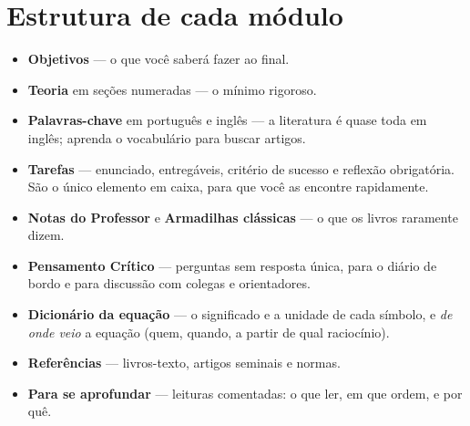 \documentclass[10pt,a4paper,twocolumn,openany]{report}
\begin{document}
\section*{Estrutura de cada módulo}
\begin{itemize}
  \item \textbf{Objetivos} --- o que você saberá fazer ao final.
  \item \textbf{Teoria} em seções numeradas --- o mínimo rigoroso.
  \item \textbf{Palavras-chave} em português e inglês --- a literatura é quase
        toda em inglês; aprenda o vocabulário para buscar artigos.
  \item \textbf{Tarefas} --- enunciado, entregáveis, critério de sucesso e
        reflexão obrigatória. São o único elemento em caixa, para que você as
        encontre rapidamente.
  \item \textbf{Notas do Professor} e \textbf{Armadilhas clássicas} --- o que
        os livros raramente dizem.
  \item \textbf{Pensamento Crítico} --- perguntas sem resposta única, para o
        diário de bordo e para discussão com colegas e orientadores.
  \item \textbf{Dicionário da equação} --- o significado e a unidade de cada
        símbolo, e \emph{de onde veio} a equação (quem, quando, a partir de
        qual raciocínio).
  \item \textbf{Referências} --- livros-texto, artigos seminais e normas.
  \item \textbf{Para se aprofundar} --- leituras comentadas: o que ler, em que
        ordem, e por quê.
\end{itemize}
\end{document}
